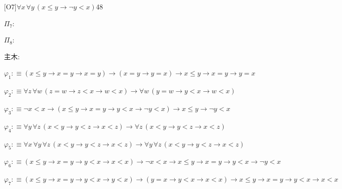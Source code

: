\begin{fullproof}{[O7]}{$\forall x\,\forall y\,(x \leq y \to \neg y < x)$}{48}
\begin{ptree}
\noLine
{}
\end{ptree}
\noindent$\Pi_{7}$:
\begin{ptree}
\end{ptree}
\noindent$\Pi_{8}$:
\begin{ptree}
\noLine
{}
\end{ptree}
\noindent 主木:
\begin{ptree}
\noLine
{}
\noLine
{}
\end{ptree}
\begin{abbrevlist}
\item $\varphi_{1} :\equiv (x \leq y \to x = y \to x = y) \to (x = y \to y = x) \to x \leq y \to x = y \to y = x$
\item $\varphi_{2} :\equiv \forall z\,\forall w\,(z = w \to z < x \to w < x) \to \forall w\,(y = w \to y < x \to w < x)$
\item $\varphi_{3} :\equiv \neg x < x \to (x \leq y \to x = y \to y < x \to \neg y < x) \to x \leq y \to \neg y < x$
\item $\varphi_{4} :\equiv \forall y\,\forall z\,(x < y \to y < z \to x < z) \to \forall z\,(x < y \to y < z \to x < z)$
\item $\varphi_{5} :\equiv \forall x\,\forall y\,\forall z\,(x < y \to y < z \to x < z) \to \forall y\,\forall z\,(x < y \to y < z \to x < z)$
\item $\varphi_{6} :\equiv (x \leq y \to x = y \to y < x \to x < x) \to \neg x < x \to x \leq y \to x = y \to y < x \to \neg y < x$
\item $\varphi_{7} :\equiv (x \leq y \to x = y \to y < x \to y < x) \to (y = x \to y < x \to x < x) \to x \leq y \to x = y \to y < x \to x < x$
\end{abbrevlist}
\end{fullproof}
